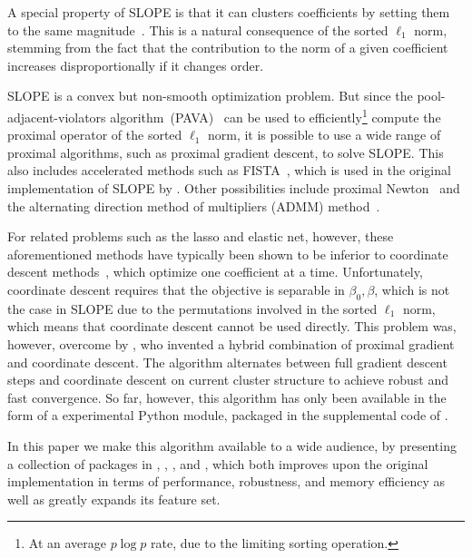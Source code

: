 \documentclass[article]{jss}
\begin{document}


A special property of SLOPE is that it can clusters coefficients by
setting them to the same magnitude~\citep{figueiredo2016,bogdan2022}. This is a natural
consequence of the sorted \(\ell_1\) norm, stemming from the fact that
the contribution to the norm of a given coefficient increases disproportionally if it
changes order.

SLOPE is a convex but non-smooth optimization problem. But since the
pool-adjacent-violators algorithm~(PAVA)~\citep{barlow1972} can be used to
efficiently\footnote{At an average \(p \log p\) rate, due to the limiting
  sorting operation.} compute the proximal operator of the sorted \(\ell_1\)
norm, it is possible to use a wide range of proximal algorithms, such
as proximal gradient descent, to solve SLOPE. This also includes accelerated
methods such as FISTA~\citep{beck2009}, which is used in the original
implementation of SLOPE by \citet{bogdan2015}. Other possibilities include
proximal Newton~\citep{lee2014} and the alternating direction method of
multipliers (ADMM) method~\citep{boyd2010}.

For related problems such as the lasso and elastic net, however, these
aforementioned methods have typically been shown to be inferior to coordinate
descent methods~\citep{friedman2007,friedman2010}, which optimize one
coefficient at a time. Unfortunately, coordinate descent requires that the
objective is separable in \(\beta_0, \beta\), which is not the case in SLOPE
due to the permutations involved in the sorted \(\ell_1\) norm, which means
that coordinate descent cannot be used directly. This problem was, however,
overcome by \citet{larsson2023}, who invented a hybrid combination of proximal
gradient and coordinate descent. The algorithm alternates between full gradient
descent steps and coordinate descent on current cluster structure to achieve
robust and fast convergence. So far, however, this algorithm has only
been available in the form of a experimental Python module, packaged
in the supplemental code of \citet{larsson2023}.

In this paper we make this algorithm available to a wide audience, by
presenting a collection of packages in , ,
, and , which both improves upon the original
implementation in terms of performance, robustness, and memory efficiency
as well as greatly expands its feature set.
\end{document}
